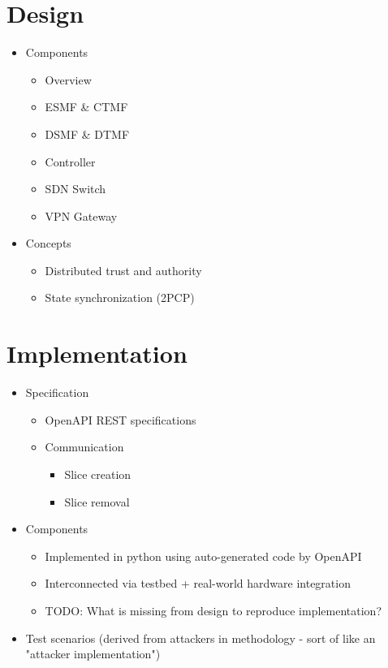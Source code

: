 \documentclass{article}
\begin{document}
\section{Design}
\begin{itemize}
    \item Components
    \begin{itemize}
        \item Overview
        \item ESMF \& CTMF
        \item DSMF \& DTMF
        \item Controller
        \item SDN Switch
        \item VPN Gateway
    \end{itemize}
    \item Concepts
    \begin{itemize}
        \item Distributed trust and authority
        \item State synchronization (2PCP)
    \end{itemize}
\end{itemize}

\section{Implementation}
\begin{itemize}
    \item Specification
    \begin{itemize}
        \item OpenAPI REST specifications
        \item Communication
        \begin{itemize}
            \item Slice creation
            \item Slice removal
        \end{itemize}
    \end{itemize}
    \item Components
    \begin{itemize}
        \item Implemented in python using auto-generated code by OpenAPI
        \item Interconnected via testbed + real-world hardware integration
        \item TODO: What is missing from design to reproduce implementation?
    \end{itemize}
    \item Test scenarios (derived from attackers in methodology - sort of like an "attacker implementation")
\end{itemize}
\end{document}
